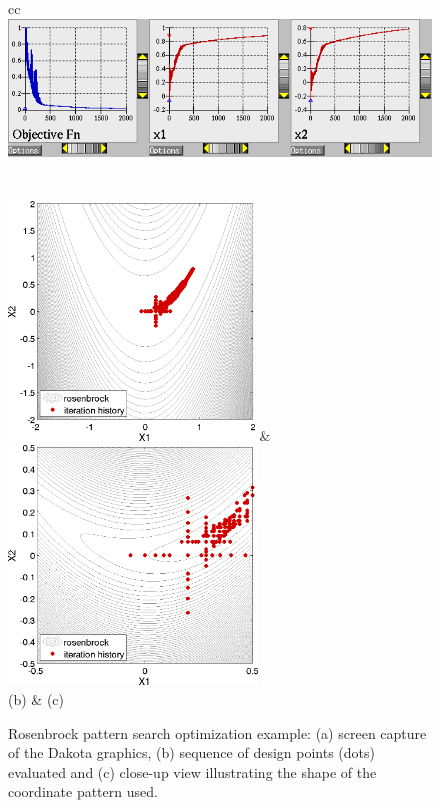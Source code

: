 \begin{figure}[ht!]
  \centering
  \begin{tabular}{cc}
	      {\includegraphics[width=\textwidth]{images/dak_graphics_ps_opt}}\\
  \\
  \qquad\\
  \includegraphics[height=2.5in]{images/rosen_ps_opt_pts} &
  \includegraphics[height=2.5in]{images/rosen_ps_opt_pts2} \\
  (b) & (c)
  \end{tabular}
  \caption{Rosenbrock pattern search optimization example: (a) screen
    capture of the Dakota graphics, (b) sequence of design points
    (dots) evaluated and (c) close-up view illustrating the shape of
    the coordinate pattern used. }
  \label{opt:examples:ps_graphics}
\end{figure}

